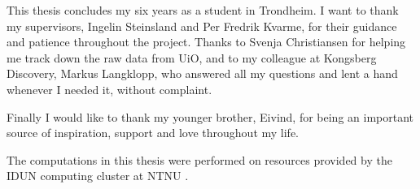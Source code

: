 

This thesis concludes my six years as a student in Trondheim. I want to thank my supervisors, Ingelin Steinsland and Per Fredrik Kvarme, for their guidance and patience throughout the project. Thanks to Svenja Christiansen for helping me track down the raw data from UiO, and to my colleague at Kongsberg Discovery, Markus Langklopp, who answered all my questions and lent a hand whenever I needed it, without complaint.

Finally I would like to thank my younger brother, Eivind, for being an important source of inspiration, support and love throughout my life.

The computations in this thesis were performed on resources provided by the IDUN computing cluster at NTNU \cite{sjalander_idun_2019}.

